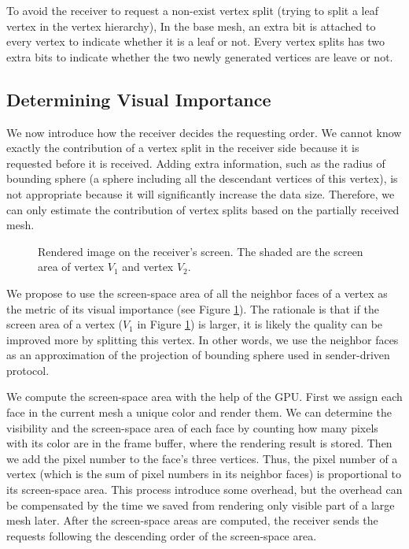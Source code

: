      To avoid the receiver to request a non-exist vertex split (trying to split
     a leaf vertex in the vertex hierarchy),
     In the base mesh, an extra bit is attached to every vertex to indicate whether it is a leaf or not.
     Every vertex splits has two extra bits to indicate whether the two newly generated vertices are 
     leave or not.
     \subsection{Determining Visual Importance}
     \label{ss:dstream:visual}
     We now introduce how the receiver decides the requesting order. 
     We cannot know exactly the contribution of a vertex split in the receiver side
     because it is requested before it is received.
     Adding extra information, such as the radius of bounding sphere (a sphere including all the 
     descendant vertices of this vertex), is not appropriate
     because it will significantly increase the data size. 
     Therefore, we can only estimate the contribution of vertex splits based on the 
     partially received mesh.
     
    \begin{figure}
    \centering
    \caption{Rendered image on the receiver's screen. 
    The shaded are the screen area of vertex $V_1$ and vertex $V_2$.
    \label{dstream:screen_area}}
    \end{figure}
     We propose to use the screen-space area of all the neighbor faces of a vertex as the 
     metric of its visual importance (see Figure \ref{dstream:screen_area}).
     The rationale is that if the screen area of a vertex ($V_1$ in Figure \ref{dstream:screen_area}) 
    is larger, it is likely the quality can be improved more by splitting this vertex. 
    In other words, we use the neighbor faces as an approximation of the projection of bounding sphere used
    in sender-driven protocol.
    
    We compute the screen-space area with the help of the GPU. 
    First we assign each face in the current mesh a unique color and render them. 
    We can determine the visibility
    and the screen-space area of each face by counting how many pixels with its color
    are in the frame buffer, where the rendering result is stored. 
    Then we add the pixel number to the face's three vertices. Thus, the
    pixel number of a vertex (which is the sum of pixel numbers in its neighbor faces)
    is proportional to its screen-space area.
    This process introduce some overhead, but the overhead can be compensated by the time
    we saved from rendering only visible part of a large mesh later. 
    After the screen-space areas are computed, 
    the receiver sends the requests following the descending order of the 
    screen-space area. 
    
